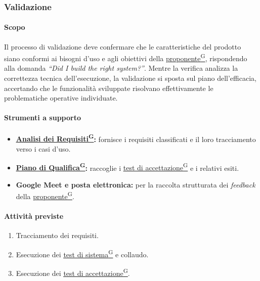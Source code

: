 \documentclass[a4paper,12pt]{article}
\providecommand{\glslink}[2]{\href{https://alittlebyte-19.github.io/Documentazione/glossario.html\#gls-#1}{\underline{#2}\textsuperscript{\scriptsize G}}}
\begin{document}
\subsubsection{Validazione}

\paragraph{Scopo}
Il processo di validazione deve confermare che le caratteristiche del prodotto siano conformi ai bisogni d'uso e agli obiettivi della \glslink{committente-proponente}{proponente}, rispondendo alla domanda \textit{``Did I build the right system?''}. Mentre la verifica analizza la correttezza tecnica dell'esecuzione, la validazione si sposta sul piano dell'efficacia, accertando che le funzionalità sviluppate risolvano effettivamente le problematiche operative individuate.

\paragraph{Strumenti a supporto}
\begin{itemize}
    \item \textbf{\glslink{analisi-dei-requisiti-adr}{Analisi dei Requisiti}:} fornisce i requisiti classificati e il loro tracciamento verso i casi d'uso.
    \item \textbf{\glslink{piano-di-qualifica}{Piano di Qualifica}:} raccoglie i \glslink{test-di-accettazione}{test di accettazione} e i relativi esiti.
    \item \textbf{Google Meet e posta elettronica:} per la raccolta strutturata dei \textit{feedback} della \glslink{committente-proponente}{proponente}.
\end{itemize}

\paragraph{Attività previste}
\begin{enumerate}
    \item Tracciamento dei requisiti.
    \item Esecuzione dei \glslink{test-di-sistema}{test di sistema} e collaudo.
    \item Esecuzione dei \glslink{test-di-accettazione}{test di accettazione}.
\end{enumerate}
\end{document}
